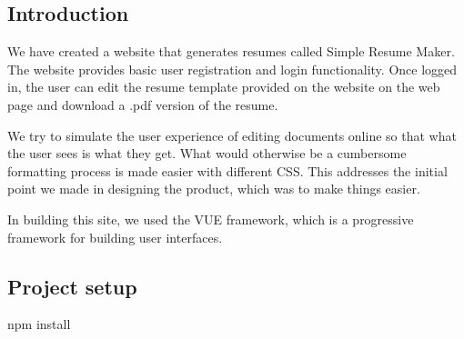 \documentclass[11pt]{article}
\begin{document}
\begin{spacing}{1.0}
	\tableofcontents
	\newpage	
	\section{Introduction}
	
	We have created a website that generates resumes called Simple Resume Maker. The website provides basic user registration and login functionality. Once logged in, the user can edit the resume template provided on the website on the web page and download a .pdf version of the resume.
	
	We try to simulate the user experience of editing documents online so that what the user sees is what they get. What would otherwise be a cumbersome formatting process is made easier with different CSS. This addresses the initial point we made in designing the product, which was to make things easier.
	
	In building this site, we used the VUE framework, which is a progressive framework for building user interfaces. 
	
	\begin{center}
		
	\end{center}

	
	\subsection{Project setup}
		npm install

\end{spacing}
\end{document}
